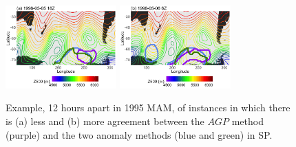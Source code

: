 \documentclass[smallextended]{svjour3}       %
\numberwithin{equation}{section}
\begin{document}
\begin{figure}
\centering
\includegraphics[width=0.38\textwidth]{fig11a}
\includegraphics[width=0.38\textwidth]{fig11b}
\caption{Example, 12 hours apart in 1995 MAM, of instances in which there is (a) less and (b) more agreement between the $AGP$ method (purple) and the two anomaly methods (blue and green) in SP.}\label{zgdiff}
\end{figure}
\end{document}
